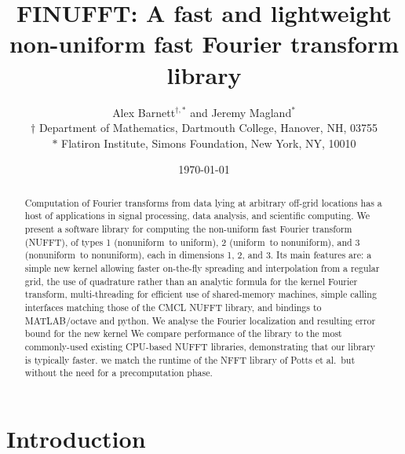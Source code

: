 \documentclass[10pt]{article}
\newcommand{\NU}{{nonuniform}}       %
\newcommand{\U}{{uniform}}
\begin{document}
\title{FINUFFT: A fast and lightweight %
  non-uniform fast Fourier transform library}
\author{Alex Barnett$^{\dag,\ast}$ and Jeremy Magland$^\ast$\\
  $\dag$ Department of Mathematics, Dartmouth College,
    Hanover, NH, 03755 \\
    $\ast$ Flatiron Institute, Simons Foundation,
    New York, NY, 10010
    }
\date{\today}
\maketitle
\begin{abstract}
  Computation of Fourier transforms from data lying at arbitrary
  off-grid locations has a host of applications in signal processing,
  data analysis, and 
  scientific computing.  We present a
  software library for computing the non-uniform fast Fourier transform
  (NUFFT),
  of types 1 (\NU\ to \U), 2 (\U\ to \NU), and
  3 (\NU\ to \NU), each in dimensions 1, 2, and 3.  Its
  main features are: a simple new kernel allowing faster on-the-fly
  spreading and interpolation from a regular grid, the use of
  quadrature rather than an analytic formula for the kernel Fourier
  transform, multi-threading for efficient use of shared-memory
  machines, simple calling interfaces matching those of the CMCL
  NUFFT library, and bindings to MATLAB/octave and python.
  We analyse the Fourier localization and resulting error bound for the
  new kernel
  We compare performance of the library to the most commonly-used
  existing CPU-based NUFFT libraries, demonstrating that our library is
  typically faster.
  we match the runtime of the NFFT library of Potts et al.\ but
  without the need for a precomputation phase.
\end{abstract}




\section{Introduction}
\end{document}
